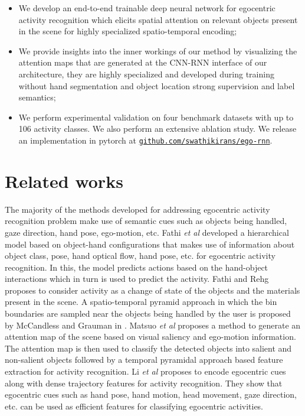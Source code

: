 \documentclass{bmvc2k}
\def\etal{\emph{et al}\bmvaOneDot}
\newcommand{\rev}[2]{#2}
\begin{document}
\begin{itemize}
\item We develop \rev{and}{an} end-to-end trainable deep neural network for egocentric activity recognition which \rev{uses}{elicits} spatial attention on relevant objects present in the scene for highly specialized spatio-temporal encoding;
\item\rev{}{We provide insights into the inner workings of our method by visualizing the attention maps that are generated at the CNN-RNN interface of our architecture, they are highly specialized and developed during training without hand segmentation and object location strong supervision and label semantics;}
\item We perform experimental validation on four benchmark datasets with up to 106 activity classes. We also perform an extensive ablation study. \rev{}{We release an implementation in pytorch at \href{https://github.com/swathikirans/ego-rnn}{\tt github.com/swathikirans/ego-rnn}}.\end{itemize}







\section{Related works}
\label{sec:rel_works}

The majority of the methods developed for addressing egocentric activity recognition problem make use of semantic cues such as objects being handled, gaze direction, hand pose, ego-motion, etc. Fathi \etal \cite{fathi2011understanding} developed a hierarchical model based on object-hand configurations that makes use of information about object class, pose, hand optical flow, hand pose, etc. for egocentric activity recognition. In this, the model predicts actions based on the hand-object interactions which in turn is used to predict the activity. Fathi and Rehg \cite{fathi2013modeling} proposes to consider activity as a change of state of the objects and the materials present in the scene. A spatio-temporal pyramid approach in which the bin boundaries are sampled near the objects being handled by the user is proposed by McCandless and Grauman in \cite{mccandless2013object}. Matsuo \etal \cite{matsuo2014attention} proposes a method to generate an attention map of the scene based on visual saliency and ego-motion information. The attention map is then used to classify the detected objects into salient and non-salient objects followed by a temporal pyramidal approach based feature extraction for activity recognition. Li \etal \cite{li2015delving} proposes to encode egocentric cues along with dense trajectory features for activity recognition. They show that egocentric cues such as hand pose, hand motion, head movement, gaze direction, etc. can be used as efficient features for classifying egocentric activities. 
\end{document}
